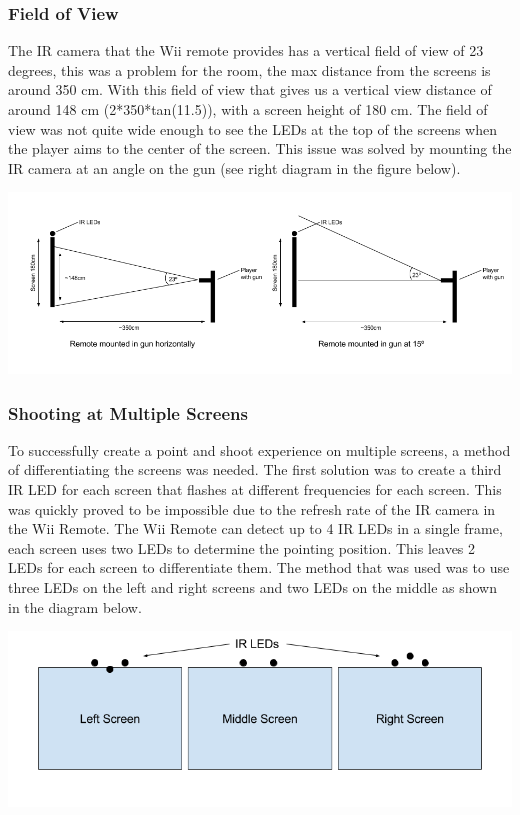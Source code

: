 \documentclass[a4paper,11pt]{article}
\begin{document}
\subsubsection{Field of View}
The IR camera that the Wii remote provides has a vertical field of view of 23 degrees, this was a problem for the room, the max distance from the screens is around 350 cm. With this field of view that gives us a vertical view distance of around 148 cm (2*350*tan(11.5)), with a screen height of 180 cm. The field of view was not quite wide enough to see the LEDs at the top of the screens when the player aims to the center of the screen. This issue was solved by mounting the IR camera at an angle on the gun (see right diagram in the figure below).

\includegraphics[scale=0.5]{ir}


\subsubsection{Shooting at Multiple Screens}
To successfully create a point and shoot experience on multiple screens, a method of differentiating the screens was needed. The first solution was to create a third IR LED for each screen that flashes at different frequencies for each screen. This was quickly proved to be impossible due to the refresh rate of the IR camera in the Wii Remote. The Wii Remote can detect up to 4 IR LEDs in a single frame, each screen uses two LEDs to determine the pointing position. This leaves 2 LEDs for each screen to differentiate them. The method that was used was to use three LEDs on the left and right screens and two LEDs on the middle as shown in the diagram below. 

\includegraphics[scale=0.5]{led_pos}
\end{document}

